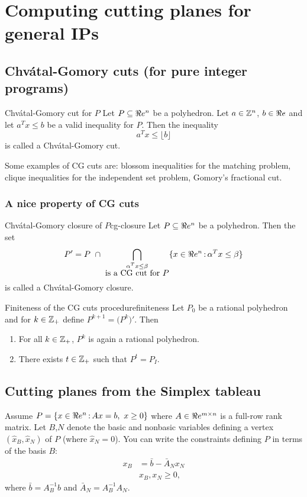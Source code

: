 \section{Computing cutting planes for general IPs}
\subsection{Chv\'atal-Gomory cuts (for pure integer programs)}

\begin{definition}{Chv\'atal-Gomory cut for $P$}{} Let $P\subseteq\Re e^n$ be a polyhedron. Let $a\in {\mathbb{Z}}^n$, $b\in \Re e$ and let $a^Tx\leq b$ be a valid inequality for $P$. Then the inequality
$$a^Tx\leq \lfloor b\rfloor$$
is called a Chv\'atal-Gomory cut.
\end{definition}
\begin{remark}{}{} Some examples of CG cuts are:  blossom inequalities for the matching problem, clique inequalities for the independent set problem, Gomory's fractional cut.
\end{remark}

\subsubsection{A nice property of CG cuts}

\begin{definition}{Chv\'atal-Gomory closure of $P$}{cg-closure}
Let $P\subseteq\Re e^n$ be a polyhedron.  Then the set
$$P'=P\ \cap\ \bigcap_{\substack{\alpha^Tx\leq\beta\\ \text{is a CG cut for $P$}}}\{x\in\R^n\tq \alpha^Tx\leq \beta\}$$
is called a Chv\'atal-Gomory closure.
\end{definition}
\begin{theorem}{Finiteness of the CG cuts procedure}{finiteness}
Let $P_0$ be a rational polyhedron and for $k\in{\mathbb{Z}}_+$ define $P^{k+1}=\big(P^k\big)'$. Then
\begin{enumerate}
	\item For all $k\in{\mathbb{Z}}_+$, $P^k$ is again a rational polyhedron.
	\item There exists $t\in{\mathbb{Z}}_+$ such that $P^t=P_I$.
\end{enumerate}
\end{theorem}
\subsection{Cutting planes from the Simplex tableau}
Assume $P=\{x\in\R^n\tq Ax=b,\ x\geq0\}$ where $A\in\Re e^{m\times n}$ is a full-row rank matrix. Let $B$,$N$ denote the basic and nonbasic variables defining a vertex $(\hat x_B,\hat x_N)$ of $P$ (where $\hat x_N=0$). You can write the constraints defining $P$ in terms of the basis $B$:
\begin{align*}
x_B&=\bar b -\bar A_N x_N\\
&x_B,x_N\geq0,
\end{align*}
where $\bar b=A_B^{-1}b$ and $\bar A_N=A_B^{-1}A_N$. 

